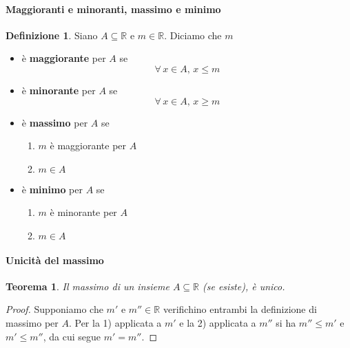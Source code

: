 \documentclass{article}
\theoremstyle{plain}
\newtheorem{thm}{Teorema}[section]
\theoremstyle{definition}
\newtheorem{defn}{Definizione}[section]
\theoremstyle{remark}
\begin{document}
\vspace{10pt}

\paragraph{Maggioranti e minoranti, massimo e minimo}
\begin{bxthm}
\begin{defn}
    Siano $A\subseteq\mathbb{R}$ e $m\in\mathbb{R}$.
    Diciamo che $m$ 
    \begin{itemize}
        \item è \textbf{maggiorante} per $A$ se 
        \[
            \forall\, x\in A,\, x\leq m
        \]
        \item è \textbf{minorante} per $A$ se 
        \[
            \forall\, x\in A,\,x\geq m
        \]
        \item è \textbf{massimo} per $A$ se 
        \begin{enumerate}
            \item $m$ è maggiorante per $A$
            \item $m\in A$
        \end{enumerate}
        \item è \textbf{minimo} per $A$ se 
        \begin{enumerate}
            \item $m$ è minorante per $A$
            \item $m\in A$
        \end{enumerate}
    \end{itemize}
\end{defn}
\end{bxthm}

\vspace{10pt}

\paragraph{Unicità del massimo}
\begin{bxthm}
\begin{thm}
    Il massimo di un insieme $A\subseteq \mathbb{R}$ (se esiste), è unico.
\end{thm}
\end{bxthm}
\begin{proof}
    Supponiamo che $m'$ e $m'' \in\mathbb{R}$ verifichino entrambi la definizione di massimo per $A$.
    Per la 1) applicata a $m'$ e la 2) applicata a $m''$ si ha $m''\leq m'$ e $m'\leq m''$, da cui segue $m'=m''$.
\end{proof}
\end{document}
